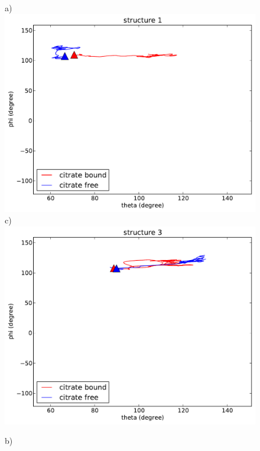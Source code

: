 \documentclass[english, a4paper, 12pt, titlepage, draft]{article}
\begin{document}
\begin{figure}
    \begin{minipage}[]{0.45\linewidth}
        \centering
        a)
        \includegraphics[width=\textwidth]{figures/Complex_trajectory/collecitve_coords_structure1.pdf}  
        c)
        \includegraphics[width=\textwidth]{figures/Complex_trajectory/collecitve_coords_structure3.pdf}  
    \end{minipage}
\hspace{0.5cm}
    \begin{minipage}[]{0.45\linewidth}
        \centering
        b)

\end{minipage}
\end{figure}
\end{document}
